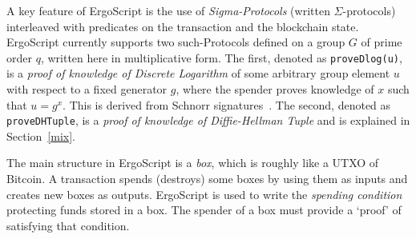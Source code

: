 \documentclass[11pt]{article}
\newcommand{\langname}{ErgoScript\xspace}
\begin{document}
A key feature of \langname is the use of {\em Sigma-Protocols} (written $\Sigma$-protocols)\cite{Dam10} interleaved with predicates on the transaction and the blockchain state. \langname currently supports two such-Protocols defined on a group $G$ of prime order $q$, written here in multiplicative form. 
The first, denoted as \texttt{proveDlog(u)}, is a {\em proof of knowledge of Discrete Logarithm} of some arbitrary group element $u$ with respect to a fixed generator $g$, where the spender proves knowledge of $x$ such that $u = g^x$.
This is derived from Schnorr signatures~\cite{Sch91}. The second, denoted as \texttt{proveDHTuple}, is a {\em proof of knowledge of Diffie-Hellman Tuple} and is explained in Section~\ref{mix}.


The main structure in \langname is a \emph{box}, which is roughly like a UTXO of Bitcoin. A transaction spends (destroys) some boxes by using them as inputs and creates new boxes as outputs.  \langname is used to write the {\em spending condition} protecting funds stored in a box. The spender of a box must provide a `proof' of satisfying that condition. 



\end{document}
